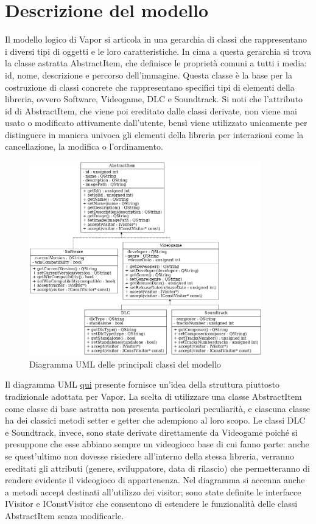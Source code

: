 \documentclass[10pt]{article}
\begin{document}
\section{Descrizione del modello}
Il modello logico di Vapor si articola in una gerarchia di classi che rappresentano i diversi tipi di oggetti e le loro caratteristiche. In cima a questa gerarchia si trova la classe astratta AbstractItem, che definisce le proprietà comuni a tutti i media: id, nome, descrizione e percorso dell'immagine. Questa classe è la base per la costruzione di classi concrete che rappresentano specifici tipi di elementi della libreria, ovvero Software, Videogame, DLC e Soundtrack. Si noti che l'attributo id di AbstractItem, che viene poi ereditato dalle classi derivate, non viene mai usato o modificato attivamente dall'utente, bensì viene utilizzato unicamente per distinguere in maniera univoca gli elementi della libreria per interazioni come la cancellazione, la modifica o l'ordinamento.
\begin{figure} [h] \label{fig:uml}
    \centering
    \includegraphics[width=0.9\textwidth]{./uml_diagram.png}
    \caption{Diagramma UML delle principali classi del modello}
\end{figure}
Il diagramma UML \hyperref[fig:uml]{qui} presente fornisce un'idea della struttura piuttosto tradizionale adottata per Vapor.
La scelta di utilizzare una classe AbstractItem come classe di base astratta non presenta particolari peculiarità, e ciascuna classe ha dei classici metodi setter e getter che adempiono al loro scopo. Le classi DLC e Soundtrack, invece, sono state derivate direttamente da Videogame poiché si presuppone che esse abbiano sempre un videogioco base di cui fanno parte: anche se quest'ultimo non dovesse risiedere all'interno della stessa libreria, verranno ereditati gli attributi (genere, sviluppatore, data di rilascio) che permetteranno di rendere evidente il videogioco di appartenenza. Nel diagramma si accenna anche a metodi accept destinati all'utilizzo dei visitor; sono state definite le interfacce IVisitor e IConstVisitor che consentono di estendere le funzionalità delle classi AbstractItem senza modificarle.
\end{document}
